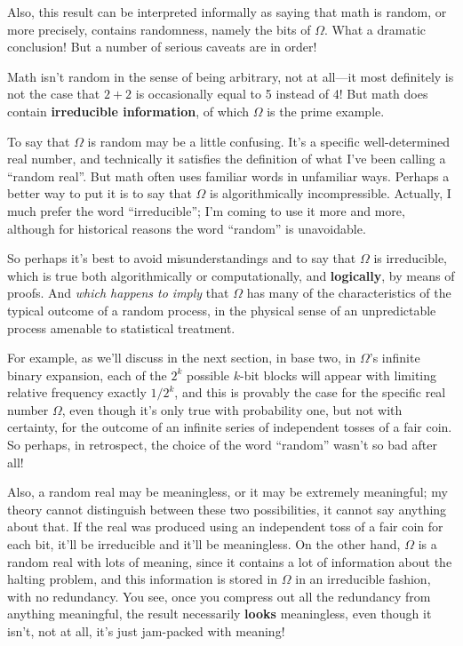 \documentclass[12pt]{book}
\begin{document}
Also, this result can be interpreted informally as saying that math is random,
or more precisely, contains randomness, namely the bits of $\Omega$.
What a dramatic conclusion!
But a number of serious caveats are in order!
 
Math isn't random in the sense of being arbitrary, not at all---it
most definitely is not the case that
$2 + 2$ is occasionally equal to 5 instead of 4!
But math does contain \textbf{irreducible information}, of which $\Omega$
is the prime example.
 
To say that $\Omega$ is random may be a little confusing. It's a specific
well-determined real number, and technically it satisfies the definition
of what I've been calling a ``random real''. But math often uses familiar
words in unfamiliar ways.  Perhaps a better way to put it is to say
that $\Omega$ is algorithmically incompressible.  Actually, I much prefer
the word ``irreducible''; I'm coming to use it more and more, although for
historical reasons the word ``random'' is unavoidable.
 
So perhaps it's best to avoid misunderstandings and to say that $\Omega$ is irreducible,
which is true both algorithmically or computationally, and \textbf{logically}, by means
of proofs.
And \emph{which happens to imply} that $\Omega$ has many of the characteristics of the typical
outcome of a random process, in the physical sense of an unpredictable process
amenable to statistical treatment.
 
For example, as we'll discuss in the next section, in base two, in $\Omega$'s infinite
binary expansion, each of the $2^k$ possible $k$-bit blocks will appear with
limiting relative frequency exactly $1/2^k$, and this is provably the case
for the specific real number $\Omega$, even though it's only true with probability
one, but not with certainty, for the outcome of an infinite series of independent
tosses of a fair coin.  So perhaps, in retrospect, the choice of the word ``random'' wasn't
so bad after all!
 
Also, a random real may be meaningless, or it may be extremely meaningful; my
theory cannot distinguish between these two possibilities, it cannot
say anything about that.  If the real was produced using an independent
toss of a fair coin for each bit, it'll be irreducible and it'll be meaningless.
On the other hand, $\Omega$ is a random real with lots of meaning, since it contains
a lot of information about the halting problem, and this information is stored in $\Omega$
in an irreducible fashion, with no redundancy.
You see, once you compress out all the redundancy from anything meaningful, the result
necessarily \textbf{looks} meaningless, even though it isn't, not at all, it's just jam-packed
with meaning!
\end{document}
